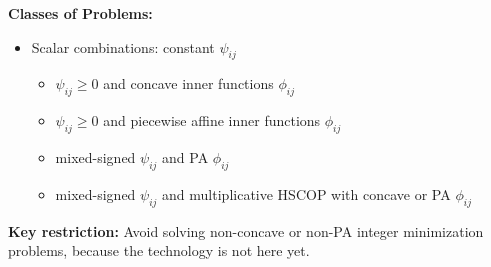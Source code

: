\documentclass[aspectratio=169,xcolor=dvipsnames]{beamer}
\begin{document}
\begin{frame}
  \small
  \setlength{\parskip}{0pt}

  \textbf{Classes of Problems:}
  \begin{itemize}
    \setlength{\itemsep}{0.06cm}
    \item {\color{MediumBlue}Scalar combinations}: constant $\psi_{ij}$
      \begin{itemize}
        \setlength{\itemsep}{0.03cm}
        \item[--] $\psi_{ij}\geq 0$ and \textcolor{MediumRed}{concave} inner
          functions $\phi_{ij}$
        \item[--] $\psi_{ij}\geq 0$ and
          \textcolor{MediumRed}{piecewise affine} inner functions $\phi_{ij}$
        \item[--] mixed-signed $\psi_{ij}$ and \textcolor{MediumRed}{PA}
          $\phi_{ij}$
        \item[--] mixed-signed $\psi_{ij}$ and
          \textcolor{MediumRed}{multiplicative HSCOP} with concave or PA
          $\phi_{ij}$
      \end{itemize}
  \end{itemize}

  \vspace{0.12cm}
  \begin{center}
  \end{center}

  \vspace{0.12cm}
  \textbf{Key restriction:} Avoid solving \textcolor{MediumRed}{non-concave}
  or \textcolor{MediumRed}{non-PA} integer minimization problems, because the
  technology is not here yet.
\end{frame}
\end{document}
